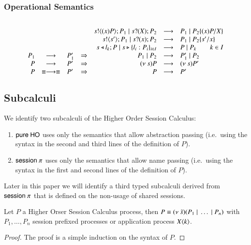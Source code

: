 \subsubsection{Operational Semantics}
\[
	\begin{array}{rcl}
	\end{array}
\]
\[
	\begin{array}{rclcrcl}
		&& && s ! \langle (x)P \rangle ; P_1 \;|\; s ? (X) ; P_2 &\longrightarrow& P_1 \;|\; P_2 \{(x)P/X \} \\
		&& && s ! \langle s' \rangle ; P_1 \;|\; s ? (x) ; P_2 &\longrightarrow& P_1 \;|\; P_2 \{s'/x \}\\
		&& && s \triangleleft l_k ; P \;|\; s \triangleright \{l_i : P_i\}_{i \in I} &\longrightarrow& P \;|\; P_k \qquad k \in I \\
		P_1 &\longrightarrow& P_1' &\Rightarrow& P_1 \;|\; P_2 &\longrightarrow& P_1' \;|\; P_2\\
		P &\longrightarrow& P' &\Rightarrow& (\nu\ s) P &\longrightarrow& (\nu\ s) P'\\
		P &\equiv \longrightarrow \equiv& P'&\Rightarrow& P &\longrightarrow& P' 		
	\end{array}
\]

\subsection{Subcalculi}

We identify two subcalculi of the Higher Order Session Calculus:
\begin{enumerate}
	\item	$\mathsf{pure\ HO}$ uses only the semantics that allow abstraction passing
		(i.e.\ using the syntax in the second and third lines of the definition of $P$).
	\item	$\mathsf{session\ }\pi$ uses only the semantics that allow name passing
		(i.e.\ using the syntax in the first and second lines of the definition of $P$).
\end{enumerate}

Later in this paper we will identify a third typed subcalculi derived
from $\mathsf{session\ }\pi$ that is defined on the non-usage of shared sessions.

\begin{proposition}[Normalisation]
	\label{prop:normal_form}
	Let $P$ a Higher Orser Session Calculus process, then
	$P \equiv (\nu\ \tilde{s})(P_1 \;|\; \dots \;|\; P_n)$ with
	$P_1, \dots, P_n$ session prefixed processes
	or application process $X\langle k \rangle$.
\end{proposition}

\begin{proof}
	The proof is a simple induction on the syntax of $P$.
\end{proof}
